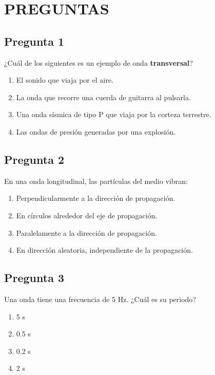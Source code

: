 \renewcommand{\tema}{Examen Diagnóstico - Ondas}


\twocolumn
\section*{PREGUNTAS}

\begin{preguntabox}
\subsection*{Pregunta 1}
¿Cuál de los siguientes es un ejemplo de onda \textbf{transversal}?

\begin{enumerate}
    \item[A)] El sonido que viaja por el aire.
    \item[B)] La onda que recorre una cuerda de guitarra al pulsarla.
    \item[C)] Una onda sísmica de tipo P que viaja por la corteza terrestre.
    \item[D)] Las ondas de presión generadas por una explosión.
\end{enumerate}
\end{preguntabox}

\begin{preguntabox}
\subsection*{Pregunta 2}
En una onda longitudinal, las partículas del medio vibran:

\begin{enumerate}
    \item[A)] Perpendicularmente a la dirección de propagación.
    \item[B)] En círculos alrededor del eje de propagación.
    \item[C)] Paralelamente a la dirección de propagación.
    \item[D)] En dirección aleatoria, independiente de la propagación.
\end{enumerate}
\end{preguntabox}

\begin{preguntabox}
\subsection*{Pregunta 3}
Una onda tiene una frecuencia de 5 Hz. ¿Cuál es su periodo?

\begin{enumerate}
    \item[A)] 5 s
    \item[B)] 0.5 s
    \item[C)] 0.2 s
    \item[D)] 2 s
\end{enumerate}
\end{preguntabox}

